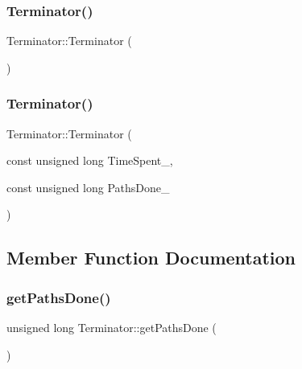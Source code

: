 \subsubsection{\texorpdfstring{Terminator()}{Terminator()}\hspace{0.1cm}{\footnotesize\ttfamily [1/2]}}
{\footnotesize\ttfamily Terminator\+::\+Terminator (\begin{DoxyParamCaption}{ }\end{DoxyParamCaption})}

\hypertarget{classTerminator_a299544700fc005ae525e1c20e34ed540}{}\label{classTerminator_a299544700fc005ae525e1c20e34ed540} 
\subsubsection{\texorpdfstring{Terminator()}{Terminator()}\hspace{0.1cm}{\footnotesize\ttfamily [2/2]}}
{\footnotesize\ttfamily Terminator\+::\+Terminator (\begin{DoxyParamCaption}\item[{const unsigned long}]{Time\+Spent\+\_\+,  }\item[{const unsigned long}]{Paths\+Done\+\_\+ }\end{DoxyParamCaption})}



\subsection{Member Function Documentation}
\hypertarget{classTerminator_af2a79ca6dac8a68305485bef15748ab5}{}\label{classTerminator_af2a79ca6dac8a68305485bef15748ab5} 
\subsubsection{\texorpdfstring{get\+Paths\+Done()}{getPathsDone()}}
{\footnotesize\ttfamily unsigned long Terminator\+::get\+Paths\+Done (\begin{DoxyParamCaption}{ }\end{DoxyParamCaption})}

\hypertarget{classTerminator_a506dd03f7b0d83ca067681a1167f83ab}{}\label{classTerminator_a506dd03f7b0d83ca067681a1167f83ab} 
